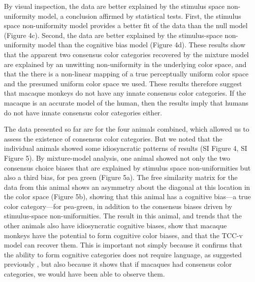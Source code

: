 By visual inspection, the data are better explained by the stimulus space non-uniformity model, a conclusion affirmed by statistical tests. First, the stimulus space non-uniformity model provides a better fit of the data than the null model (Figure 4c). Second, the data are better explained by the stimulus-space non-uniformity model than the cognitive bias model (Figure 4d). These results show that the apparent two consensus color categories recovered by the mixture model are explained by an unwitting non-uniformity in the underlying color space, and that the there is a non-linear mapping of a true perceptually uniform color space and the presumed uniform color space we used. These results therefore suggest that macaque monkeys do not have any innate consensus color categories. If the macaque is an accurate model of the human, then the results imply that humans do not have innate consensus color categories either. 

The data presented so far are for the four animals combined, which allowed us to assess the existence of consensus color categories. But we noted that the individual animals showed some idiosyncratic patterns of results (SI Figure 4, SI Figure 5). By mixture-model analysis, one animal showed not only the two consensus choice biases that are explained by stimulus space non-uniformities but also a third bias, for pea green (Figure 5a). The free similarity matrix for the data from this animal shows an asymmetry about the diagonal at this location in the color space (Figure 5b), showing that this animal has a cognitive bias---a true color category---for pea-green, in addition to the consensus biases driven by stimulus-space non-uniformities. The result in this animal, and trends that the other animals also have idiosyncratic cognitive biases, show that macaque monkeys have the potential to form cognitive color biases, and that the TCC-v model can recover them. This is important not simply because it confirms that the ability to form cognitive categories does not require language, as suggested previously \citep{panichello_error-correcting_2019}, but also because it shows that if macaques had consensus color categories, we would have been able to observe them.


